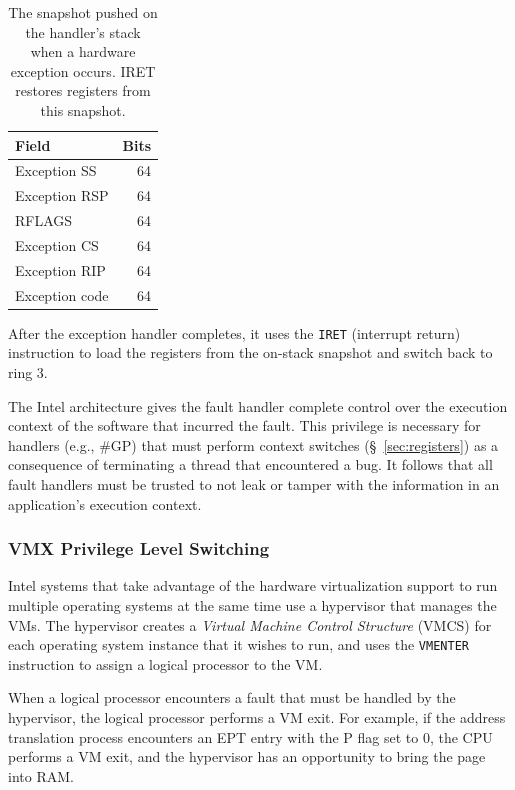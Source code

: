 \begin{table}[hbt]
  \centering
  \begin{tabular}{| l | r |}
  \hline
  \textbf{Field} & \textbf{Bits} \\
  \hline
  Exception SS & 64 \\
  \hline
  Exception RSP & 64 \\
  \hline
  RFLAGS & 64 \\
  \hline
  Exception CS & 64 \\
  \hline
  Exception RIP & 64 \\
  \hline
  Exception code & 64 \\
  \hline
  \end{tabular}
  \caption{
    The snapshot pushed on the handler's stack when a hardware exception
    occurs. IRET restores registers from this snapshot.
  }
  \label{fig:fault_stack}
\end{table}

After the exception handler completes, it uses the \texttt{IRET} (interrupt
return) instruction to load the registers from the on-stack snapshot and switch
back to ring 3.

The Intel architecture gives the fault handler complete control over the
execution context of the software that incurred the fault. This privilege is
necessary for handlers (e.g., \#GP) that must perform context switches
(\S~\ref{sec:registers}) as a consequence of terminating a thread that
encountered a bug. It follows that all fault handlers must be trusted to not
leak or tamper with the information in an application's execution context.


\subsubsection{VMX Privilege Level Switching}
\label{sec:vmx}


Intel systems that take advantage of the hardware virtualization support to run
multiple operating systems at the same time use a hypervisor that manages the
VMs. The hypervisor creates a \textit{Virtual Machine Control Structure} (VMCS)
for each operating system instance that it wishes to run, and uses the
\texttt{VMENTER} instruction to assign a logical processor to the VM.


When a logical processor encounters a fault that must be handled by the
hypervisor, the logical processor performs a VM exit. For example, if the
address translation process encounters an EPT entry with the P flag set to 0,
the CPU performs a VM exit, and the hypervisor has an opportunity to bring the
page into RAM.

